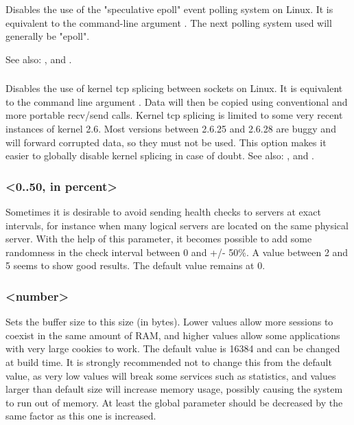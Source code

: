 Disables the use of the "speculative epoll" event polling system on Linux. It
is equivalent to the command-line argument . The next polling system
used will generally be "epoll".

See also: , and .

\subsubsection[nosplice]{}

Disables the use of kernel tcp splicing between sockets on Linux. It is
equivalent to the command line argument .  Data will then be copied
using conventional and more portable recv/send calls. Kernel tcp splicing is
limited to some very recent instances of kernel 2.6. Most versions between
2.6.25 and 2.6.28 are buggy and will forward corrupted data, so they must not
be used. This option makes it easier to globally disable kernel splicing in
case of doubt. See also: ,  and
.

\subsubsection[spread-checks]{ <0..50, in percent>}

Sometimes it is desirable to avoid sending health checks to servers at exact
intervals, for instance when many logical servers are located on the same
physical server. With the help of this parameter, it becomes possible to add
some randomness in the check interval between 0 and +/- 50\%. A value between
2 and 5 seems to show good results. The default value remains at 0.

\subsubsection[tune.bufsize]{ <number>}

Sets the buffer size to this size (in bytes). Lower values allow more
sessions to coexist in the same amount of RAM, and higher values allow some
applications with very large cookies to work. The default value is 16384 and
can be changed at build time. It is strongly recommended not to change this
from the default value, as very low values will break some services such as
statistics, and values larger than default size will increase memory usage,
possibly causing the system to run out of memory. At least the global 
parameter should be decreased by the same factor as this one is increased.

